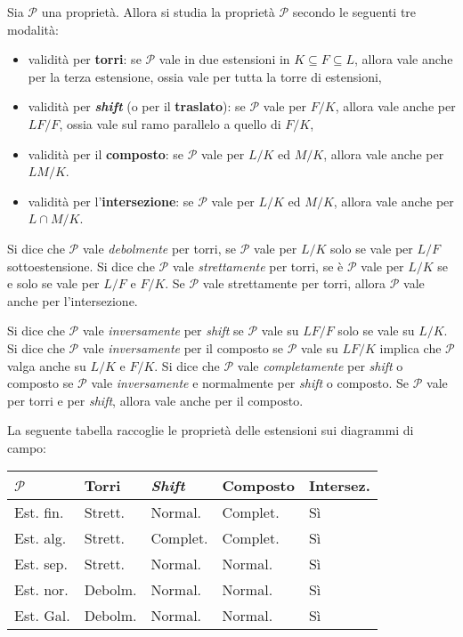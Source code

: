 \documentclass[10pt,landscape]{article}
\begin{document}
\begin{multicols}{3}
		
		Sia $\mathcal{P}$ una proprietà. Allora si
		studia la proprietà $\mathcal{P}$ secondo
		le seguenti tre modalità:
		\begin{itemize}
			\item validità per \textbf{torri}: se $\mathcal{P}$ vale in due estensioni in $K \subseteq F \subseteq L$, allora vale anche per la terza estensione, ossia
			vale per tutta la torre di estensioni,
			\item validità per \textbf{\textit{shift}} (o per il \textbf{traslato}): se $\mathcal{P}$ vale
			per $F / K$, allora vale anche per $LF / F$, ossia
			vale sul ramo parallelo a quello di $F / K$,
			\item validità per il \textbf{composto}: se
			$\mathcal{P}$ vale per $L / K$ ed $M / K$, allora
			vale anche per $LM / K$.
			\item validità per l'\textbf{intersezione}:
			se $\mathcal{P}$ vale per $L / K$ ed $M / K$,
			allora vale anche per $L \cap M / K$.
		\end{itemize}
		Si dice che $\mathcal{P}$ vale \textit{debolmente}
		per torri, se $\mathcal{P}$ vale per $L / K$ solo
		se vale per $L / F$ sottoestensione.
		Si dice che $\mathcal{P}$ vale \textit{strettamente}
		per torri, se è $\mathcal{P}$ vale per $L / K$ se
		e solo se vale per $L / F$ e $F / K$. Se $\mathcal{P}$ vale strettamente per torri, allora $\mathcal{P}$
		vale anche per l'intersezione. \medskip
		
		
		Si dice che
		$\mathcal{P}$ vale \textit{inversamente} per
		\textit{shift} se $\mathcal{P}$ vale su
		$LF / F$ solo se vale su $L / K$. Si dice che
		$\mathcal{P}$ vale \textit{inversamente} per
		il composto se $\mathcal{P}$ vale su $LF / K$
		implica che $\mathcal{P}$ valga anche su $L / K$
		e $F / K$. Si dice che $\mathcal{P}$ vale \textit{completamente} per \textit{shift} o composto se $\mathcal{P}$
		vale \textit{inversamente} e normalmente per \textit{shift} o
		composto. Se $\mathcal{P}$ vale per torri e
		per \textit{shift}, allora vale anche per il
		composto.
		
		La seguente tabella raccoglie le proprietà
		delle estensioni sui diagrammi di campo:
		\begin{center}
			\scriptsize
			\vskip -0.1in
			\begin{tabular}{l|l|l|l|l}
				\hline
				$\mathcal{P}$ & Torri        & \textit{Shift} & Composto      & Intersez. \\ \hline
				Est. fin.            & Strett. & Normal.                     & Complet. & Sì           \\ \hline
				Est. alg.         & Strett. & Complet.                   & Complet. & Sì           \\ \hline
				Est. sep.        & Strett. & Normal.                     & Normal.   & Sì           \\ \hline
				Est. nor.           & Debolm.   & Normal.                     & Normal.   & Sì           \\ \hline
				Est. Gal.        & Debolm.   & Normal.                     & Normal.   & Sì          
			\end{tabular}
		\end{center}



\end{multicols}
\end{document}
